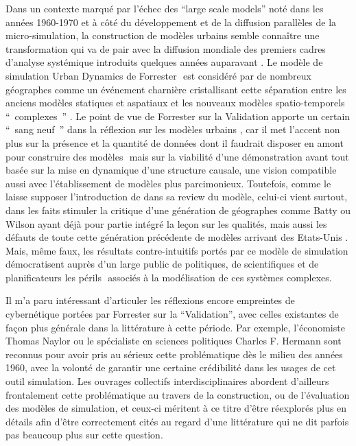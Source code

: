 Dans un contexte marqué par l'échec des \foreignquote{english}{large scale models} noté dans les années 1960-1970 \autocite{Lee1973} et à côté du développement et de la diffusion parallèles de la micro-simulation, la construction de modèles urbains semble connaître une transformation qui va de pair avec la diffusion mondiale des premiers cadres d'analyse systémique introduits quelques années auparavant \autocites{Ackerman1963, Harvey1969, Berry1964a, Chorley1962, Haggett1965}⁠. Le modèle de simulation Urban Dynamics de Forrester \autocite{Forrester1969}⁠ est considéré par de nombreux géographes comme un événement charnière cristallisant cette séparation entre les anciens modèles statiques et aspatiaux et les nouveaux modèles spatio-temporels \enquote{ complexes } \autocites{Batty1976, Batty2005b}. Le point de vue de Forrester sur la Validation apporte un certain \enquote{ sang neuf } dans la réflexion sur les modèles urbains \autocite{Lee1973}⁠, car il met l'accent non plus sur la présence et la quantité de données dont il faudrait disposer en amont pour construire des modèles \autocite[355]{Batty1976}⁠ mais sur la viabilité d'une démonstration avant tout basée sur la mise en dynamique d'une structure causale, une vision compatible aussi avec l'établissement de modèles plus parcimonieux. Toutefois, comme le laisse supposer l'introduction de \textcite{Tobler1970a} dans sa review du modèle, celui-ci vient surtout, dans les faits stimuler la critique d'une génération de géographes comme Batty ou Wilson ayant déjà pour partie intégré la leçon sur les qualités, mais aussi les défauts de toute cette génération précédente de modèles arrivant des Etats-Unis \autocite{Batty1971}
. Mais, même faux, les résultats contre-intuitifs portés par ce modèle de simulation démocratisent auprès d'un large public de politiques, de scientifiques et de planificateurs les périls \autocite{Berry1970}
⁠ associés à la modélisation de ces systèmes complexes.

Il m'a paru intéressant d'articuler les réflexions encore empreintes de cybernétique portées par Forrester sur la \enquote{Validation}, avec celles existantes de façon plus générale dans la littérature à cette période. Par exemple, l'économiste Thomas Naylor ou le spécialiste en sciences politiques Charles F. Hermann \autocites{Naylor1966,Naylor1967, Naylor1969, Hermann1967} sont reconnus \autocites{Nance2002, Balci1986} ⁠pour avoir pris au sérieux cette problématique dès le milieu des années 1960, avec la volonté de garantir une certaine crédibilité dans les usages de cet outil simulation. Les ouvrages collectifs interdisciplinaires \autocites{Guetzkow1972, Dutton1971} abordent d'ailleurs frontalement cette problématique au travers de la construction, ou de l'évaluation des modèles de simulation, et ceux-ci méritent à ce titre d'être réexplorés plus en détails afin d'être correctement cités au regard d'une littérature qui ne dit parfois pas beaucoup plus sur cette question. 

